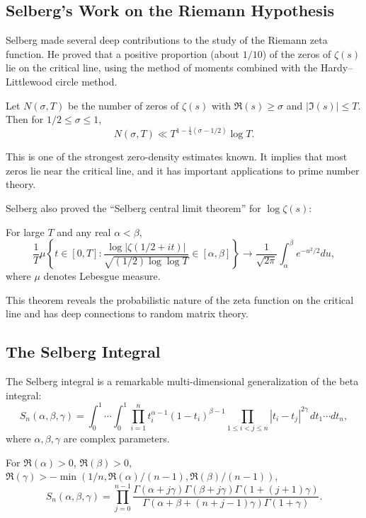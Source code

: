 \subsection{Selberg's Work on the Riemann Hypothesis}

Selberg made several deep contributions to the study of the Riemann zeta function. He proved that a positive proportion (about \(1/10\)) of the zeros of \(\zeta(s)\) lie on the critical line, using the method of moments combined with the Hardy--Littlewood circle method.

\begin{theorem}
Let \(N(\sigma, T)\) be the number of zeros of \(\zeta(s)\) with \(\Re(s) \geq \sigma\) and \(|\Im(s)| \leq T\). Then for \(1/2 \leq \sigma \leq 1\),
\[
N(\sigma, T) \ll T^{1 - \frac{1}{4}(\sigma - 1/2)} \log T.
\]
\end{theorem}

This is one of the strongest zero-density estimates known. It implies that most zeros lie near the critical line, and it has important applications to prime number theory.

Selberg also proved the ``Selberg central limit theorem'' for \(\log \zeta(s)\):

\begin{theorem}
For large \(T\) and any real \(\alpha < \beta\),
\[
\frac{1}{T} \mu\left\{ t \in [0,T] : \frac{\log |\zeta(1/2 + it)|}{\sqrt{(1/2) \log\log T}} \in [\alpha, \beta] \right\} \to \frac{1}{\sqrt{2\pi}} \int_\alpha^\beta e^{-u^2/2} du,
\]
where \(\mu\) denotes Lebesgue measure.
\end{theorem}

This theorem reveals the probabilistic nature of the zeta function on the critical line and has deep connections to random matrix theory.

\subsection{The Selberg Integral}

The Selberg integral is a remarkable multi-dimensional generalization of the beta integral:
\[
S_n(\alpha, \beta, \gamma) = \int_0^1 \cdots \int_0^1 \prod_{i=1}^n t_i^{\alpha-1} (1 - t_i)^{\beta-1} \prod_{1 \leq i < j \leq n} |t_i - t_j|^{2\gamma} \, dt_1 \cdots dt_n,
\]
where \(\alpha, \beta, \gamma\) are complex parameters.

\begin{theorem}
For \(\Re(\alpha) > 0\), \(\Re(\beta) > 0\), \(\Re(\gamma) > -\min(1/n, \Re(\alpha)/(n-1), \Re(\beta)/(n-1))\),
\[
S_n(\alpha, \beta, \gamma) = \prod_{j=0}^{n-1} \frac{\Gamma(\alpha + j\gamma) \Gamma(\beta + j\gamma) \Gamma(1 + (j+1)\gamma)}{\Gamma(\alpha + \beta + (n+j-1)\gamma) \Gamma(1 + \gamma)}.
\]
\end{theorem}

